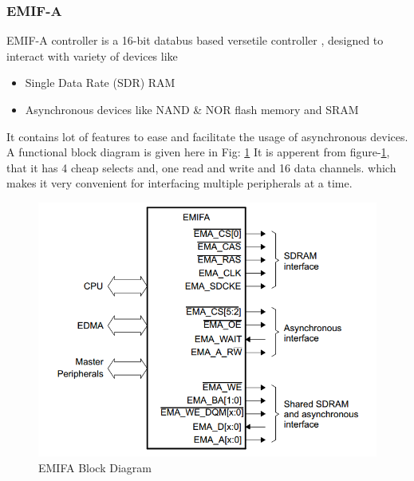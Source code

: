 \subsubsection{EMIF-A}
EMIF-A controller is a 16-bit databus based versetile controller \cite{uguide:emifa}, designed to interact with variety of devices like 
\begin{itemize}
\item Single Data Rate (SDR) RAM
\item Asynchronous devices like NAND \& NOR flash memory and SRAM
\end{itemize}
It contains lot of features to ease and facilitate the usage of asynchronous devices. A functional block diagram is given here in Fig: \ref{fig:EMIFA} 
It is apperent from figure-\ref{fig:EMIFA}, that it has 4 cheap selects and, one read and write and 16 data channels. which makes it very convenient for interfacing multiple peripherals at a time. 
\begin{figure}[ht]
\includegraphics[width=\columnwidth]{fig/EMIFA.png}
\caption{EMIFA Block Diagram \cite{uguide:emifa} }
\label{fig:EMIFA}
\end{figure}

